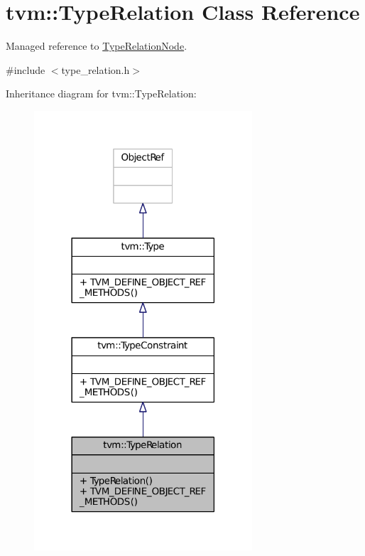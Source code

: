 \hypertarget{classtvm_1_1TypeRelation}{}\section{tvm\+:\+:Type\+Relation Class Reference}
\label{classtvm_1_1TypeRelation}


Managed reference to \hyperlink{classtvm_1_1TypeRelationNode}{Type\+Relation\+Node}.  




{\ttfamily \#include $<$type\+\_\+relation.\+h$>$}



Inheritance diagram for tvm\+:\+:Type\+Relation\+:
\nopagebreak
\begin{figure}[H]
\begin{center}
\leavevmode
\includegraphics[width=230pt]{classtvm_1_1TypeRelation__inherit__graph}
\end{center}
\end{figure}


